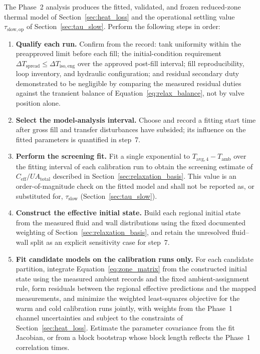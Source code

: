 \documentclass[11pt]{article}
\newcommand{\Tavg}{T_{\mathrm{avg},4}}
\newcommand{\Tamb}{T_{\mathrm{amb}}}
\begin{document}
The Phase~2 analysis produces the fitted, validated, and frozen reduced-zone thermal model of Section~\ref{sec:heat_loss} and the operational settling value $\tau_{\mathrm{slow,op}}$ of Section~\ref{sec:tau_slow}. Perform the following steps in order:

\begin{enumerate}
    \item \textbf{Qualify each run.} Confirm from the record: tank uniformity within the preapproved limit before each fill; the initial-condition requirement $\Delta T_{\mathrm{spread}}\leq\Delta T_{\mathrm{iso,eng}}$ over the approved post-fill interval; fill reproducibility, loop inventory, and hydraulic configuration; and residual secondary duty demonstrated to be negligible by comparing the measured residual duties against the transient balance of Equation~\eqref{eq:relax_balance}, not by valve position alone.

    \item \textbf{Select the model-analysis interval.} Choose and record a fitting start time after gross fill and transfer disturbances have subsided; its influence on the fitted parameters is quantified in step~7.

    \item \textbf{Perform the screening fit.} Fit a single exponential to $\Tavg-\Tamb$ over the fitting interval of each calibration run to obtain the screening estimate of $C_{\mathrm{eff}}/UA_{\mathrm{total}}$ described in Section~\ref{sec:relaxation_basis}. This value is an order-of-magnitude check on the fitted model and shall not be reported as, or substituted for, $\tau_{\mathrm{slow}}$ (Section~\ref{sec:tau_slow}).

    \item \textbf{Construct the effective initial state.} Build each regional initial state from the measured fluid and wall distributions using the fixed documented weighting of Section~\ref{sec:relaxation_basis}, and retain the unresolved fluid--wall split as an explicit sensitivity case for step~7.

    \item \textbf{Fit candidate models on the calibration runs only.} For each candidate partition, integrate Equation~\eqref{eq:zone_matrix} from the constructed initial state using the measured ambient records and the fixed ambient-assignment rule, form residuals between the regional effective predictions and the mapped measurements, and minimize the weighted least-squares objective for the warm and cold calibration runs jointly, with weights from the Phase~1 channel uncertainties and subject to the constraints of Section~\ref{sec:heat_loss}. Estimate the parameter covariance from the fit Jacobian, or from a block bootstrap whose block length reflects the Phase~1 correlation times.


\end{enumerate}
\end{document}
